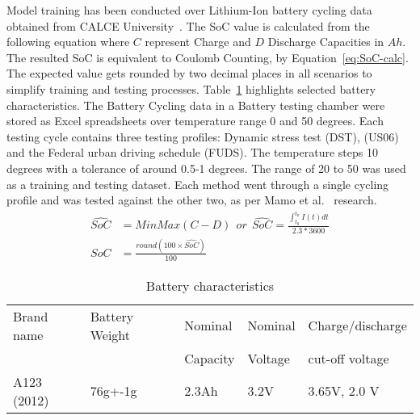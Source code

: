 Model training has been conducted over Lithium-Ion battery cycling data obtained from CALCE University~\cite{noauthor_calce_2017}.
The SoC value is calculated from the following equation where $C$ represent Charge and $D$ Discharge Capacities in $Ah$.
The resulted SoC is equivalent to Coulomb Counting, by Equation~\ref{eq:SoC-calc}.
The expected value gets rounded by two decimal places in all scenarios to simplify training and testing processes. 
Table~\ref{tab:battery} highlights selected battery characteristics.
The Battery Cycling data in a Battery testing chamber were stored as Excel spreadsheets over temperature range 0 and 50 degrees.
Each testing cycle contains three testing profiles: Dynamic stress test (DST), (US06) and the Federal urban driving schedule (FUDS).
The temperature steps 10 degrees with a tolerance of around 0.5-1 degrees.
The range of 20 to 50 was used as a training and testing dataset.
Each method went through a single cycling profile and was tested against the other two, as per Mamo et al.~\cite{mamo_long_2020} research.
\begin{equation}
    \begin{split}
        \hat{SoC} &= MinMax(C-D)\ \ or\ \ \hat{SoC} = \frac{\int_{t_0}^{t_n} I(t)dt} {2.3*3600} \\
        SoC &= \frac{round(100\times\hat{SoC})}{100}
        \label{eq:SoC-calc}
    \end{split}
\end{equation}
\begin{table}[ht]
    \centering
    \caption{Battery characteristics}
    \label{tab:battery}
    \begin{tabular}{ p{2.7cm} p{2.7cm} p{2.7cm} p{2.7cm} p{2.7cm}   }
        \hline
        Brand name & Battery Weight & Nominal  & Nominal & Charge/discharge\\
                   &                & Capacity & Voltage & cut-off voltage \\
        \hline
        A123 (2012) & 76g+-1g & 2.3Ah & 3.2V & 3.65V, 2.0 V\\
        \hline
    \end{tabular}
\end{table}
